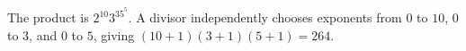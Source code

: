 The product is $2^{10}3^35^5$. A divisor independently chooses exponents from $0$ to $10$, $0$ to $3$, and $0$ to $5$, giving $(10+1)(3+1)(5+1)=\boxed{264}$.
